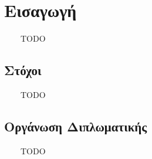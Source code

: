 \chapter{Εισαγωγή}
\label{chap:Intro}

\ \ \ \ TODO

\section{Στόχοι}

\ \ \ \ TODO

\section{Οργάνωση Διπλωματικής}

\ \ \ \ TODO
